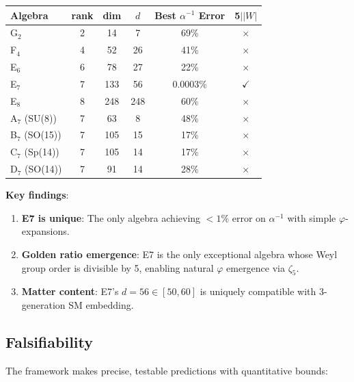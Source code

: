 \documentclass[11pt,a4paper]{article}
\begin{document}
\begin{center}
\begin{tabular}{|l|c|c|c|c|c|}
\hline
\textbf{Algebra} & \textbf{rank} & \textbf{dim} & \textbf{$d$} & \textbf{Best $\alpha^{-1}$ Error} & \textbf{5$|$$|W|$} \\
\hline
G$_2$ & 2 & 14 & 7 & 69\% & $\times$ \\
F$_4$ & 4 & 52 & 26 & 41\% & $\times$ \\
E$_6$ & 6 & 78 & 27 & 22\% & $\times$ \\
E$_7$ & 7 & 133 & 56 & 0.0003\% & $\checkmark$ \\
E$_8$ & 8 & 248 & 248 & 60\% & $\times$ \\
A$_7$ (SU(8)) & 7 & 63 & 8 & 48\% & $\times$ \\
B$_7$ (SO(15)) & 7 & 105 & 15 & 17\% & $\times$ \\
C$_7$ (Sp(14)) & 7 & 105 & 14 & 17\% & $\times$ \\
D$_7$ (SO(14)) & 7 & 91 & 14 & 28\% & $\times$ \\
\hline
\end{tabular}
\end{center}

\textbf{Key findings}:
\begin{enumerate}
\item \textbf{E7 is unique}: The only algebra achieving $< 1\%$ error on $\alpha^{-1}$ with simple $\varphi$-expansions.
\item \textbf{Golden ratio emergence}: E7 is the only exceptional algebra whose Weyl group order is divisible by 5, enabling natural $\varphi$ emergence via $\zeta_5$.
\item \textbf{Matter content}: E7's $d = 56 \in [50, 60]$ is uniquely compatible with 3-generation SM embedding.
\end{enumerate}



\subsection{Falsifiability}

The framework makes precise, testable predictions with quantitative bounds:
\end{document}
